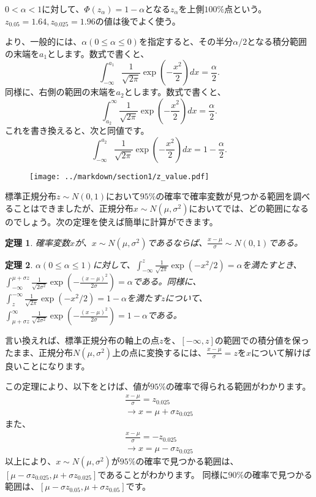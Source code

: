 \documentclass[a4paper,11pt,dvipdfmx]{jsarticle}
\newtheorem{theo}{定理}[section]
\begin{document}
$0<\alpha<1$に対して、$\Phi(z_\alpha) = 1-\alpha$となる$z_\alpha$を上側$100\%$点という。
$z_{0.05}=1.64,z_{0.025}=1.96$の値は後でよく使う。

より、一般的には、$\alpha(0\leq \alpha \leq 0)$を指定すると、その半分$\alpha/2$となる積分範囲の末端を$a_1$とします。数式で書くと、
\begin{equation}
    \int_{-\infty}^{a_1} \frac{1}{\sqrt{2\pi}}\exp(-\frac{x^2}{2})dx = \frac{\alpha}{2}.
\end{equation}
同様に、右側の範囲の末端を$a_2$とします。数式で書くと、
\begin{equation*}
    \int_{a_2}^{\infty} \frac{1}{\sqrt{2\pi}}\exp(-\frac{x^2}{2})dx = \frac{\alpha}{2}.
\end{equation*}
これを書き換えると、次と同値です。
\begin{equation*}
    \int_{-\infty}^{a_2} \frac{1}{\sqrt{2\pi}}\exp(-\frac{x^2}{2})dx = 1-\frac{\alpha}{2}.
\end{equation*}

\begin{figure}
\begin{center}
    \texttt{[image: ../markdown/section1/z\_value.pdf]}
  \end{center}
\end{figure}

標準正規分布$z\sim N(0,1)$において$95\%$の確率で確率変数が見つかる範囲を調べることはできましたが、正規分布$x\sim N(\mu,\sigma^2)$においてでは、どの範囲になるのでしょう。次の定理を使えば簡単に計算ができます。
\begin{theo}
    確率変数$x$が、$x\sim N(\mu,\sigma^2)$であるならば、$\frac{x-\mu}{\sigma}\sim N(0,1)$である。    
\end{theo}
\begin{theo}
$\alpha(0\leq \alpha\leq 1)$に対して、$\int_{-\infty}^{z}\frac{1}{\sqrt{2\pi}}\exp(-x^2/2)=\alpha$を満たすとき、$\int_{-\infty}^{\mu+\sigma z} \frac{1}{\sqrt{2\sigma^2}}\exp(-\frac{(x-\mu)^2}{2\sigma})=\alpha$である。同様に、$\int_{z}^{-\infty}\frac{1}{\sqrt{2\pi}}\exp(-x^2/2)=1-\alpha$を満たす$z$について、$\int_{\mu+\sigma z}^{\infty} \frac{1}{\sqrt{2\sigma^2}}\exp(-\frac{(x-\mu)^2}{2\sigma})=1-\alpha$である。
\end{theo}
言い換えれば、標準正規分布の軸上の点$z$を、$[-\infty,z]$の範囲での積分値を保ったまま、正規分布$N(\mu,\sigma^2)$上の点に変換するには、$\frac{x-\mu}{\sigma}=z$を$x$について解けば良いことになります。

この定理により、以下をとけば、値が$95\%$の確率で得られる範囲がわかります。
\begin{eqnarray*}
    \frac{x-\mu}{\sigma}=z_{0.025}\\
    \rightarrow x = \mu+\sigma z_{0.025}
\end{eqnarray*}
また、
\begin{eqnarray*}
    \frac{x-\mu}{\sigma}=-z_{0.025}\\
    \rightarrow x = \mu-\sigma z_{0.025}
\end{eqnarray*}
以上により、$x \sim N(\mu,\sigma^2)$が$95\%$の確率で見つかる範囲は、$[\mu-\sigma z_{0.025},\mu+\sigma z_{0.025}]$であることがわかります。
同様に$90\%$の確率で見つかる範囲は、$[\mu-\sigma z_{0.05},\mu+\sigma z_{0.05}]$です。
\end{document}
